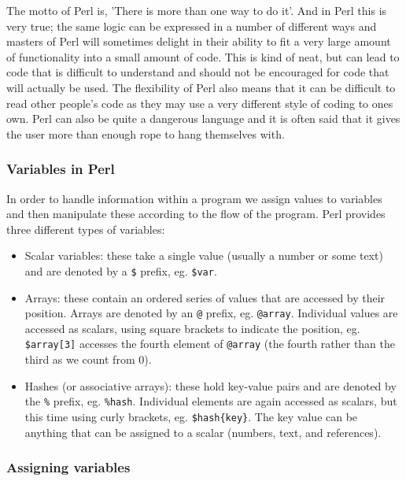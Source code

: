 \documentclass[11pt]{article}
\begin{document}
The motto of Perl is, 'There is more than one way to do it'. And in Perl
this is very true; the same logic can be expressed in a number of
different ways and masters of Perl will sometimes delight in their
ability to fit a very large amount of functionality into a small amount
of code. This is kind of neat, but can lead to code that is difficult to
understand and should not be encouraged for code that will
actually be used. The flexibility of Perl also means that it can be
difficult to read other people's code as they may use a very different
style of coding to ones own. Perl can also be quite a dangerous language
and it is often said that it gives the user more than enough rope to
hang themselves with.

\subsubsection{Variables in Perl}
\label{sec-5-0-1}

In order to handle information within a program we assign values to
variables and then manipulate these according to the flow of the
program. Perl provides three different types of variables:

\begin{itemize}
\item Scalar variables: these take a single value (usually a number or some text) 
and are denoted by a \texttt{\$} prefix, eg. \texttt{\$var}.

\item Arrays: these contain an ordered series of values that are accessed by their
position. Arrays are denoted by an \texttt{@} prefix, eg. \texttt{@array}.
Individual values are accessed as scalars, using square brackets to
indicate the position, eg. \texttt{\$array[3]} accesses the fourth element of
\texttt{@array} (the fourth rather than the third as we count from 0).

\item Hashes (or associative arrays): these hold key-value pairs and are
denoted by the \texttt{\%} prefix, eg. \texttt{\%hash}. Individual elements are again
accessed as scalars, but this time using curly brackets, eg.
\texttt{\$hash\{key\}}. The key value can be anything that can be assigned to a
scalar (numbers, text, and references).
\end{itemize}

\subsubsection{Assigning variables}
\label{sec-5-0-2}
\end{document}
